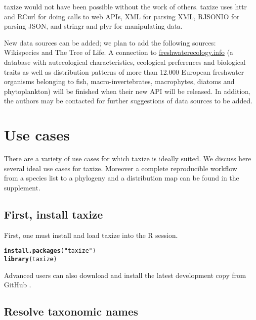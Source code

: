 \documentclass[10pt]{article}\usepackage[]{graphicx}\usepackage[]{color}
\makeatletter
\newcommand{\hlstr}[1]{\textcolor[rgb]{0.192,0.494,0.8}{#1}}%
\newcommand{\hlkwd}[1]{\textcolor[rgb]{0.737,0.353,0.396}{\textbf{#1}}}%
\newenvironment{kframe}{%
 \def\at@end@of@kframe{}%
 \ifinner\ifhmode%
  \def\at@end@of@kframe{\end{minipage}}%
  \begin{minipage}{\columnwidth}%
 \fi\fi%
 \def\FrameCommand##1{\hskip\@totalleftmargin \hskip-\fboxsep
 \colorbox{shadecolor}{##1}\hskip-\fboxsep
     \hskip-\linewidth \hskip-\@totalleftmargin \hskip\columnwidth}%
 \MakeFramed {\advance\hsize-\width
   \@totalleftmargin\z@ \linewidth\hsize
   \@setminipage}}%
 {\par\unskip\endMakeFramed%
 \at@end@of@kframe}
\newenvironment{knitrout}{}{} %
\makeatother
\begin{document}
taxize would not have been possible without the work of others. taxize uses httr \cite{httr} and RCurl \cite{rcurl} for doing calls to web APIs, XML \cite{xml} for parsing XML, RJSONIO \cite{rjsonio} for parsing JSON, and stringr \cite{stringr} and plyr \cite{plyr} for manipulating data.

New data sources can be added; we plan to add the following sources: Wikispecies and The Tree of Life. A connection to \url{freshwaterecology.info} \cite{freshwaterecology} (a database with autecological characteristics, ecological preferences and biological traits as well as distribution patterns of more than 12.000 European freshwater organisms belonging to fish, macro-invertebrates, macrophytes, diatoms and phytoplankton) will be finished when their new API will be released.
In addition, the authors may be contacted for further suggestions of data sources to be added.

\section*{Use cases}

There are a variety of use cases for which taxize is ideally suited. We discuss here several ideal use cases for taxize. Moreover a complete reproducible workflow from a species list to a phylogeny and a distribution map can be found in the supplement.

\subsection*{First, install taxize}

First, one must install and load taxize into the R session.

\begin{knitrout}
\color{fgcolor}\begin{kframe}
\begin{alltt}
\hlkwd{install.packages}(\hlstr{"taxize"})
\hlkwd{library}(taxize)
\end{alltt}
\end{kframe}
\end{knitrout}


Advanced users can also download and install the latest development copy from GitHub \cite{github_taxize}.

\subsection*{Resolve taxonomic names}
\end{document}
